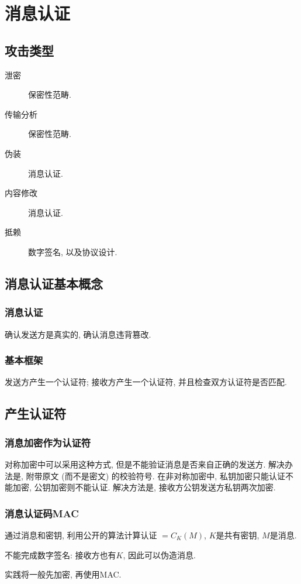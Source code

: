 \documentclass{ctexart}
\begin{document}
\section{消息认证}
\subsection{攻击类型}
    \begin{description}
        \item[泄密] 保密性范畴.
        \item[传输分析] 保密性范畴.
        \item[伪装] 消息认证.
        \item[内容修改] 消息认证.
        \item[抵赖] 数字签名, 以及协议设计.
    \end{description}
\subsection{消息认证基本概念}
\subsubsection{消息认证} 确认发送方是真实的, 确认消息违背篡改.
\subsubsection{基本框架} 发送方产生一个认证符; 接收方产生一个认证符, 并且检查双方认证符是否匹配.

\subsection{产生认证符}
\subsubsection{消息加密作为认证符} 对称加密中可以采用这种方式, 但是不能验证消息是否来自正确的发送方.
    解决办法是, 附带原文 (而不是密文) 的校验符号.
    在非对称加密中, 私钥加密只能认证不能加密, 公钥加密则不能认证.
    解决方法是, 接收方公钥发送方私钥两次加密.
\subsubsection{消息认证码MAC}
    通过消息和密钥, 利用公开的算法计算认证 $= C_K(M)$, $K$是共有密钥, $M$是消息.\par
    不能完成数字签名: 接收方也有$K$, 因此可以伪造消息.\par
    实践将一般先加密, 再使用MAC.
\end{document}
